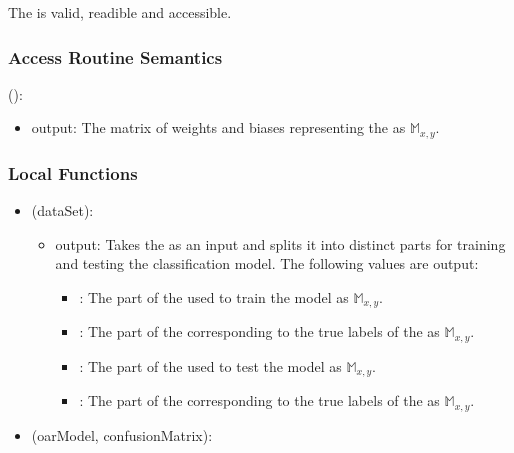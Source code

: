 \documentclass[12pt, titlepage]{article}
\begin{document}
The  is valid, readible and accessible.

\subsubsection{Access Routine Semantics}

\noindent {}():
\begin{itemize}
\item output: The matrix of weights and biases representing the  as $\mathbb{M}_{x, y}$.
\end{itemize}

\subsubsection{Local Functions}

\begin{itemize}
\item {}(dataSet):
  \begin{itemize}
    \item output: Takes the  as an input and splits it into distinct parts for training and testing the classification model.
    The following values are output:
    \begin{itemize}
      \item {}: The part of the  used to train the model as $\mathbb{M}_{x, y}$.
      \item {}: The part of the  corresponding to the true labels of the  as $\mathbb{M}_{x, y}$.
      \item {}: The part of the  used to test the model as $\mathbb{M}_{x, y}$.
      \item {}: The part of the  corresponding to the true labels of the  as $\mathbb{M}_{x, y}$.
    \end{itemize}
  \end{itemize}
\item {}(oarModel, confusionMatrix):
\end{itemize}
\end{document}
